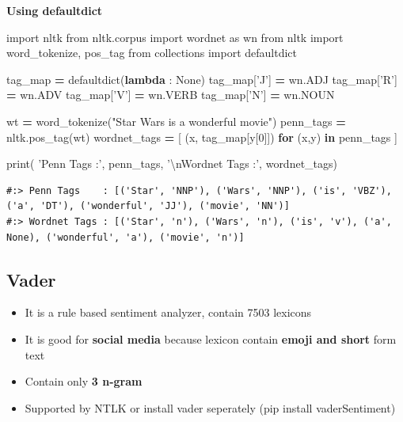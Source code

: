 \documentclass[
]{book}
\newenvironment{Shaded}{\begin{snugshade}}{\end{snugshade}}
\newcommand{\BuiltInTok}[1]{#1}
\newcommand{\CharTok}[1]{\textcolor[rgb]{0.5,0.5,0.5}{#1}}
\newcommand{\ControlFlowTok}[1]{\textcolor[rgb]{0.27,0.27,0.27}{\textbf{#1}}}
\newcommand{\DecValTok}[1]{\textcolor[rgb]{0.06,0.06,0.06}{#1}}
\newcommand{\ImportTok}[1]{#1}
\newcommand{\KeywordTok}[1]{\textcolor[rgb]{0.27,0.27,0.27}{\textbf{#1}}}
\newcommand{\NormalTok}[1]{#1}
\newcommand{\OperatorTok}[1]{\textcolor[rgb]{0.43,0.43,0.43}{\textbf{#1}}}
\newcommand{\StringTok}[1]{\textcolor[rgb]{0.5,0.5,0.5}{#1}}
\newcommand{\VariableTok}[1]{\textcolor[rgb]{0,0,0}{#1}}
\providecommand{\tightlist}{%
  \setlength{\itemsep}{0pt}\setlength{\parskip}{0pt}}
\begin{document}
\textbf{Using defaultdict}

\begin{Shaded}
\begin{Highlighting}[]
\ImportTok{import}\NormalTok{ nltk}
\ImportTok{from}\NormalTok{ nltk.corpus }\ImportTok{import}\NormalTok{ wordnet }\ImportTok{as}\NormalTok{ wn}
\ImportTok{from}\NormalTok{ nltk }\ImportTok{import}\NormalTok{ word_tokenize, pos_tag}
\ImportTok{from}\NormalTok{ collections }\ImportTok{import}\NormalTok{ defaultdict}

\NormalTok{tag_map }\OperatorTok{=}\NormalTok{ defaultdict(}\KeywordTok{lambda}\NormalTok{ : }\VariableTok{None}\NormalTok{)}
\NormalTok{tag_map[}\StringTok{'J'}\NormalTok{] }\OperatorTok{=}\NormalTok{ wn.ADJ}
\NormalTok{tag_map[}\StringTok{'R'}\NormalTok{] }\OperatorTok{=}\NormalTok{ wn.ADV}
\NormalTok{tag_map[}\StringTok{'V'}\NormalTok{] }\OperatorTok{=}\NormalTok{ wn.VERB}
\NormalTok{tag_map[}\StringTok{'N'}\NormalTok{] }\OperatorTok{=}\NormalTok{ wn.NOUN}

\NormalTok{wt }\OperatorTok{=}\NormalTok{ word_tokenize(}\StringTok{"Star Wars is a wonderful movie"}\NormalTok{)}
\NormalTok{penn_tags }\OperatorTok{=}\NormalTok{ nltk.pos_tag(wt)}
\NormalTok{wordnet_tags }\OperatorTok{=}\NormalTok{ [ (x, tag_map[y[}\DecValTok{0}\NormalTok{]]) }\ControlFlowTok{for}\NormalTok{ (x,y) }\KeywordTok{in}\NormalTok{ penn_tags ]}

\BuiltInTok{print}\NormalTok{(}
\StringTok{'Penn Tags    :'}\NormalTok{, penn_tags, }
\StringTok{'}\CharTok{\textbackslash{}n}\StringTok{Wordnet Tags :'}\NormalTok{, wordnet_tags)}
\end{Highlighting}
\end{Shaded}

\begin{verbatim}
#:> Penn Tags    : [('Star', 'NNP'), ('Wars', 'NNP'), ('is', 'VBZ'), ('a', 'DT'), ('wonderful', 'JJ'), ('movie', 'NN')] 
#:> Wordnet Tags : [('Star', 'n'), ('Wars', 'n'), ('is', 'v'), ('a', None), ('wonderful', 'a'), ('movie', 'n')]
\end{verbatim}

\hypertarget{vader}{%
\subsection{Vader}\label{vader}}

\begin{itemize}
\tightlist
\item
  It is a rule based sentiment analyzer, contain 7503 lexicons
\item
  It is good for \textbf{social media} because lexicon contain \textbf{emoji and short} form text
\item
  Contain only \textbf{3 n-gram}
\item
  Supported by NTLK or install vader seperately (pip install vaderSentiment)
\end{itemize}
\end{document}
